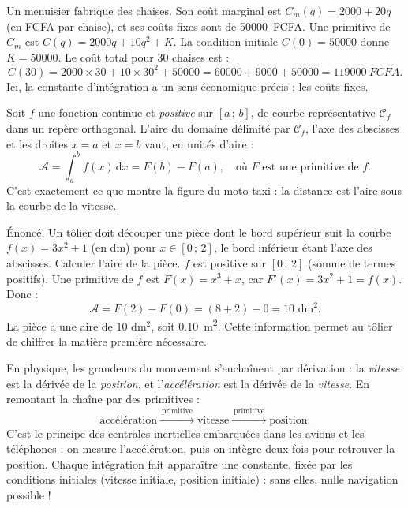 \documentclass[11pt]{article}
\newcommand{\cle}[1]{{\popxbold\color{popdark}#1}}
\newcounter{popsec}
\newcounter{popsub}
\newcommand{\courssub}[1]{%
  \stepcounter{popsub}%
  \par\vspace{9pt}\noindent{\popxbold\fontsize{11.5}{13}\selectfont\color{popink}{\color{poporange}\thepopsec.\thepopsub}\hspace{6pt}#1}\par\nopagebreak\vspace{4pt}
}
\begin{document}
\begin{exemplebox}
Un menuisier fabrique des chaises. Son coût marginal est $C_m(q) = 2000 + 20q$ (en FCFA par chaise), et ses coûts fixes sont de \SI{50000}{FCFA}. Une primitive de $C_m$ est $C(q) = 2000q + 10q^2 + K$. La condition initiale $C(0) = 50000$ donne $K = 50000$. Le coût total pour 30 chaises est :
\[ C(30) = 2000 \times 30 + 10 \times 30^2 + 50000 = 60000 + 9000 + 50000 = \SI{119000}{FCFA}. \]
Ici, la constante d'intégration a un sens économique précis : les coûts fixes.
\end{exemplebox}

\courssub{Aire sous une courbe (géométrie)}

\begin{propriete}
Soit $f$ une fonction continue et \emph{positive} sur $[a\,;\,b]$, de courbe représentative $\mathcal{C}_f$ dans un repère orthogonal. L'\cle{aire} du domaine délimité par $\mathcal{C}_f$, l'axe des abscisses et les droites $x = a$ et $x = b$ vaut, en unités d'aire :
\[ \mathcal{A} = \int_a^b f(x)\,\mathrm{d}x = F(b) - F(a), \quad \text{où } F \text{ est une primitive de } f. \]
C'est exactement ce que montre la figure du moto-taxi : la distance est l'aire sous la courbe de la vitesse.
\end{propriete}

\begin{exoresolu}
Énoncé. Un tôlier doit découper une pièce dont le bord supérieur suit la courbe $f(x) = 3x^2 + 1$ (en dm) pour $x \in [0\,;\,2]$, le bord inférieur étant l'axe des abscisses. Calculer l'aire de la pièce.
\tcblower
$f$ est positive sur $[0\,;\,2]$ (somme de termes positifs). Une primitive de $f$ est $F(x) = x^3 + x$, car $F'(x) = 3x^2 + 1 = f(x)$. Donc :
\[ \mathcal{A} = F(2) - F(0) = (8 + 2) - 0 = 10 \text{ dm}^2. \]
La pièce a une aire de $10$ dm$^2$, soit \SI{0,10}{m^2}. Cette information permet au tôlier de chiffrer la matière première nécessaire.
\end{exoresolu}

\begin{savaistu}
En physique, les grandeurs du mouvement s'enchaînent par dérivation : la \emph{vitesse} est la dérivée de la \emph{position}, et l'\emph{accélération} est la dérivée de la \emph{vitesse}. En remontant la chaîne par des primitives :
\[ \text{accélération} \xrightarrow{\ \text{primitive}\ } \text{vitesse} \xrightarrow{\ \text{primitive}\ } \text{position}. \]
C'est le principe des centrales inertielles embarquées dans les avions et les téléphones : on mesure l'accélération, puis on intègre deux fois pour retrouver la position. Chaque intégration fait apparaître une constante, fixée par les conditions initiales (vitesse initiale, position initiale) : sans elles, nulle navigation possible !
\end{savaistu}
\end{document}
